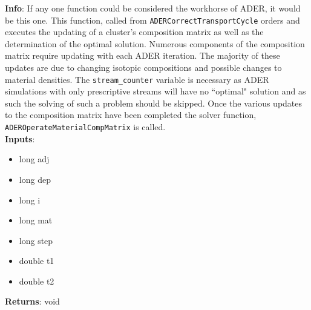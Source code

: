 \textbf{Info}: If any one function could be considered the workhorse of ADER, 
it would be this one. This function, called from
\texttt{ADERCorrectTransportCycle} orders and executes the updating of a
cluster's composition matrix as well as the determination of the optimal
solution. Numerous components of the composition matrix require updating with
each ADER iteration. The majority of these updates are due to changing isotopic
compositions and possible changes to material densities.
The \texttt{stream\_counter} variable is necessary as ADER simulations with
only prescriptive streams will have no ``optimal" solution and as such the
solving of such a problem should be skipped. Once the various updates to the
composition matrix have been completed the solver function, 
\texttt{ADEROperateMaterialCompMatrix} is called.\\

\noindent \textbf{Inputs}:
\begin{itemize}
\item{long adj}
\item{long dep}
\item{long i}
\item{long mat}
\item{long step}
\item{double t1}
\item{double t2}
\end{itemize}

\noindent \textbf{Returns}: void
